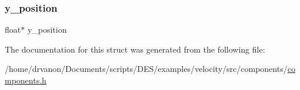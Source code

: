 \subsubsection{\texorpdfstring{y\+\_\+position}{y\_position}}
{\footnotesize\ttfamily float$\ast$ y\+\_\+position}



The documentation for this struct was generated from the following file\+:\begin{DoxyCompactItemize}
\item 
/home/drvanon/\+Documents/scripts/\+D\+E\+S/examples/velocity/src/components/\mbox{\hyperlink{components_8h}{components.\+h}}\end{DoxyCompactItemize}
